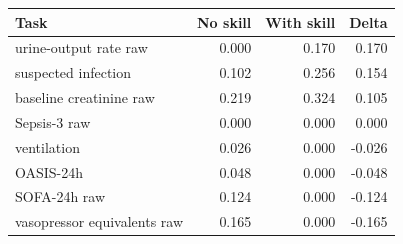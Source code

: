 \begin{tabular}{lrrr}
\toprule
Task & No skill & With skill & Delta \\
\midrule
urine-output rate raw & 0.000 & 0.170 & 0.170 \\
suspected infection & 0.102 & 0.256 & 0.154 \\
baseline creatinine raw & 0.219 & 0.324 & 0.105 \\
Sepsis-3 raw & 0.000 & 0.000 & 0.000 \\
ventilation & 0.026 & 0.000 & -0.026 \\
OASIS-24h & 0.048 & 0.000 & -0.048 \\
SOFA-24h raw & 0.124 & 0.000 & -0.124 \\
vasopressor equivalents raw & 0.165 & 0.000 & -0.165 \\
\bottomrule
\end{tabular}
